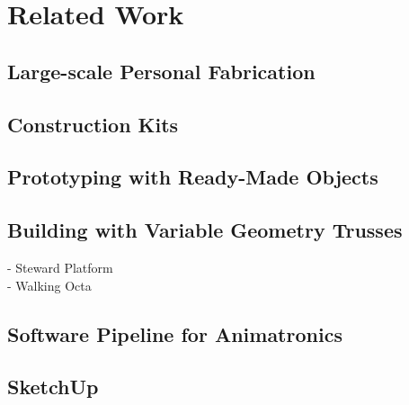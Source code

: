 \chapter{Related Work}\label{ch:relatedwork}
\section{Large-scale Personal Fabrication}
\section{Construction Kits}
\section{Prototyping with Ready-Made Objects}
\section{Building with Variable Geometry Trusses}
- Steward Platform\\
- Walking Octa\\
\section{Software Pipeline for Animatronics}
\section{SketchUp}
